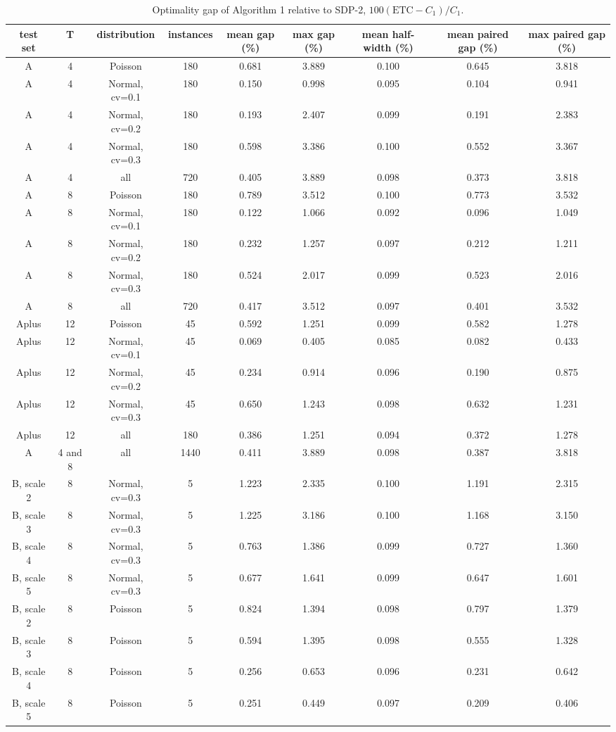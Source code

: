 \begin{table}[H]
\centering
\caption{Optimality gap of Algorithm 1 relative to SDP-2, $100(\mathrm{ETC}-C_1)/C_1$.}
\label{tab:test2_Q1_gap}
\begin{tabular}{ccccccccc}
\toprule
test set & T & distribution & instances & mean gap (\%) & max gap (\%) & mean half-width (\%) & mean paired gap (\%) & max paired gap (\%) \\
\midrule
A & 4 & Poisson & 180 & 0.681 & 3.889 & 0.100 & 0.645 & 3.818 \\
A & 4 & Normal, cv=0.1 & 180 & 0.150 & 0.998 & 0.095 & 0.104 & 0.941 \\
A & 4 & Normal, cv=0.2 & 180 & 0.193 & 2.407 & 0.099 & 0.191 & 2.383 \\
A & 4 & Normal, cv=0.3 & 180 & 0.598 & 3.386 & 0.100 & 0.552 & 3.367 \\
A & 4 & all & 720 & 0.405 & 3.889 & 0.098 & 0.373 & 3.818 \\
A & 8 & Poisson & 180 & 0.789 & 3.512 & 0.100 & 0.773 & 3.532 \\
A & 8 & Normal, cv=0.1 & 180 & 0.122 & 1.066 & 0.092 & 0.096 & 1.049 \\
A & 8 & Normal, cv=0.2 & 180 & 0.232 & 1.257 & 0.097 & 0.212 & 1.211 \\
A & 8 & Normal, cv=0.3 & 180 & 0.524 & 2.017 & 0.099 & 0.523 & 2.016 \\
A & 8 & all & 720 & 0.417 & 3.512 & 0.097 & 0.401 & 3.532 \\
Aplus & 12 & Poisson & 45 & 0.592 & 1.251 & 0.099 & 0.582 & 1.278 \\
Aplus & 12 & Normal, cv=0.1 & 45 & 0.069 & 0.405 & 0.085 & 0.082 & 0.433 \\
Aplus & 12 & Normal, cv=0.2 & 45 & 0.234 & 0.914 & 0.096 & 0.190 & 0.875 \\
Aplus & 12 & Normal, cv=0.3 & 45 & 0.650 & 1.243 & 0.098 & 0.632 & 1.231 \\
Aplus & 12 & all & 180 & 0.386 & 1.251 & 0.094 & 0.372 & 1.278 \\
A & 4 and 8 & all & 1440 & 0.411 & 3.889 & 0.098 & 0.387 & 3.818 \\
B, scale 2 & 8 & Normal, cv=0.3 & 5 & 1.223 & 2.335 & 0.100 & 1.191 & 2.315 \\
B, scale 3 & 8 & Normal, cv=0.3 & 5 & 1.225 & 3.186 & 0.100 & 1.168 & 3.150 \\
B, scale 4 & 8 & Normal, cv=0.3 & 5 & 0.763 & 1.386 & 0.099 & 0.727 & 1.360 \\
B, scale 5 & 8 & Normal, cv=0.3 & 5 & 0.677 & 1.641 & 0.099 & 0.647 & 1.601 \\
B, scale 2 & 8 & Poisson & 5 & 0.824 & 1.394 & 0.098 & 0.797 & 1.379 \\
B, scale 3 & 8 & Poisson & 5 & 0.594 & 1.395 & 0.098 & 0.555 & 1.328 \\
B, scale 4 & 8 & Poisson & 5 & 0.256 & 0.653 & 0.096 & 0.231 & 0.642 \\
B, scale 5 & 8 & Poisson & 5 & 0.251 & 0.449 & 0.097 & 0.209 & 0.406 \\
\bottomrule
\end{tabular}
\end{table}